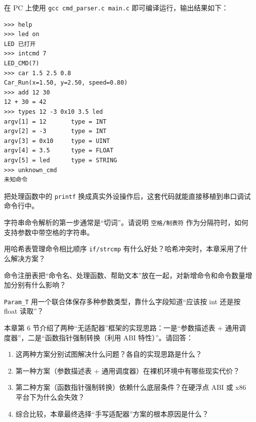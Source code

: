 在 PC 上使用 \texttt{gcc cmd\_parser.c main.c} 即可编译运行，输出结果如下：

\begin{lstlisting}
>>> help
>>> led on
LED 已打开
>>> intcmd 7
LED_CMD(7)
>>> car 1.5 2.5 0.8
Car_Run(x=1.50, y=2.50, speed=0.80)
>>> add 12 30
12 + 30 = 42
>>> types 12 -3 0x10 3.5 led
argv[1] = 12       type = INT
argv[2] = -3       type = INT
argv[3] = 0x10     type = UINT
argv[4] = 3.5      type = FLOAT
argv[5] = led      type = STRING
>>> unknown_cmd
未知命令
\end{lstlisting}

把处理函数中的 \texttt{printf} 换成真实外设操作后，这套代码就能直接移植到串口调试命令行中。

\begin{problemset}
\item 字符串命令解析的第一步通常是“切词”。请说明 \texttt{空格/制表符} 作为分隔符时，如何支持参数中带空格的字符串。
\item 用哈希表管理命令相比顺序 \texttt{if/strcmp} 有什么好处？哈希冲突时，本章采用了什么解决方案？
\item 命令注册表把“命令名、处理函数、帮助文本”放在一起，对新增命令和命令数量增加分别有什么影响？
\item \texttt{Param\_T} 用一个联合体保存多种参数类型，靠什么字段知道“应该按 int 还是按 float 读取”？
\item 本章第 6 节介绍了两种“无适配器”框架的实现思路：一是“参数描述表 + 通用调度器”，二是“函数指针强制转换（利用 ABI 特性）”。请回答：
\begin{enumerate}
	\item 这两种方案分别试图解决什么问题？各自的实现思路是什么？
	\item 第一种方案（参数描述表 + 通用调度器）在裸机环境中有哪些现实代价？
	\item 第二种方案（函数指针强制转换）依赖什么底层条件？在硬浮点 ABI 或 x86 平台下为什么会失效？
	\item 综合比较，本章最终选择“手写适配器”方案的根本原因是什么？
\end{enumerate}
\end{problemset}
